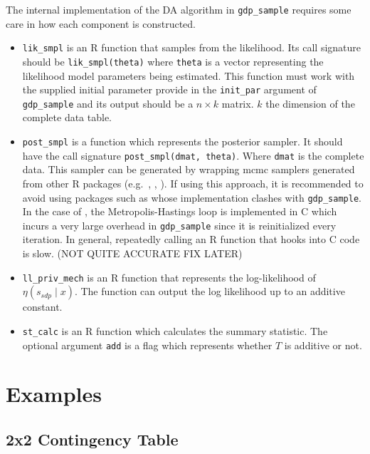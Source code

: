 The internal implementation of the DA algorithm in \texttt{gdp\_sample} requires
some care in how each component is constructed.

\begin{itemize}
\item
  \texttt{lik\_smpl} is an R function that samples from the likelihood. Its
  call signature should be \texttt{lik\_smpl(theta)} where \texttt{theta} is a vector
  representing the likelihood model parameters being estimated. This function
  must work with the supplied initial parameter provide in the \texttt{init\_par}
  argument of \texttt{gdp\_sample} and its output should be a \(n \times k\) matrix. \(k\) the
  dimension of the complete data table.
\item
  \texttt{post\_smpl} is a function which represents the posterior sampler. It should
  have the call signature \texttt{post\_smpl(dmat,\ theta)}. Where \texttt{dmat} is the
  complete data. This sampler can be generated by wrapping mcmc samplers generated from other R packages
  (e.g.~, , ).
  If using this approach, it is recommended to avoid using packages such as 
  whose implementation clashes with \texttt{gdp\_sample}. In the case of ,
  the Metropolis-Hastings loop is implemented in C which incurs a very large overhead
  in \texttt{gdp\_sample} since it is reinitialized every iteration. In general, repeatedly calling
  an R function that hooks into C code is slow. (NOT QUITE ACCURATE FIX LATER)
\item
  \texttt{ll\_priv\_mech} is an R function that represents the log-likelihood of
  \(\eta(s_{sdp} \mid x)\). The function can output the log likelihood
  up to an additive constant.
\item
  \texttt{st\_calc} is an R function which calculates the summary statistic. The optional
  argument \texttt{add} is a flag which represents whether \(T\) is additive or not.
\end{itemize}

\hypertarget{examples}{%
\section{Examples}\label{examples}}

\hypertarget{x2-contingency-table}{%
\subsection{2x2 Contingency Table}\label{x2-contingency-table}}

